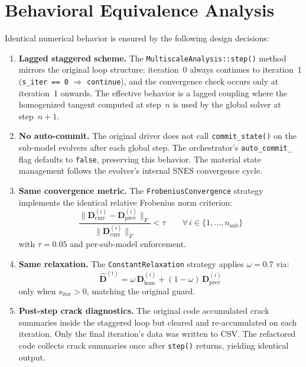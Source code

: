 \section{Behavioral Equivalence Analysis}
\label{sec:driver-equivalence}

Identical numerical behavior is ensured by the following design
decisions:

\begin{enumerate}
  \item \textbf{Lagged staggered scheme.}  The
    \texttt{MultiscaleAnalysis::step()} method mirrors the original
    loop structure: iteration~0 always continues to iteration~1
    (\texttt{s\_iter == 0} $\Rightarrow$ \texttt{continue}), and the
    convergence check occurs only at iteration~1 onwards.  The
    effective behavior is a lagged coupling where the homogenized
    tangent computed at step~$n$ is used by the global solver at
    step~$n+1$.

  \item \textbf{No auto-commit.}  The original driver does not call
    \texttt{commit\_state()} on the sub-model evolvers after each
    global step.  The orchestrator's \texttt{auto\_commit\_} flag
    defaults to \texttt{false}, preserving this behavior.  The
    material state management follows the evolver's internal SNES
    convergence cycle.

  \item \textbf{Same convergence metric.}  The
    \texttt{FrobeniusConvergence} strategy implements the identical
    relative Frobenius norm criterion:
    \begin{equation}\label{eq:driver-conv}
      \frac{\|\mathbf{D}_\text{curr}^{(i)} -
            \mathbf{D}_\text{prev}^{(i)}\|_F}
           {\|\mathbf{D}_\text{curr}^{(i)}\|_F}
      < \tau
      \qquad \forall\, i \in \{1, \dots, n_\text{sub}\}
    \end{equation}
    with $\tau = 0.05$ and per-sub-model enforcement.

  \item \textbf{Same relaxation.}  The \texttt{ConstantRelaxation}
    strategy applies $\omega = 0.7$ via:
    \begin{equation}\label{eq:driver-relax}
      \hat{\mathbf{D}}^{(i)} = \omega\, \mathbf{D}_\text{hom}^{(i)}
        + (1 - \omega)\, \mathbf{D}_\text{prev}^{(i)}
    \end{equation}
    only when $s_\text{iter} > 0$, matching the original guard.

  \item \textbf{Post-step crack diagnostics.}  The original code
    accumulated crack summaries inside the staggered loop but
    cleared and re-accumulated on each iteration.  Only the final
    iteration's data was written to CSV.  The refactored code
    collects crack summaries once after \verb|step()| returns,
    yielding identical output.
\end{enumerate}


